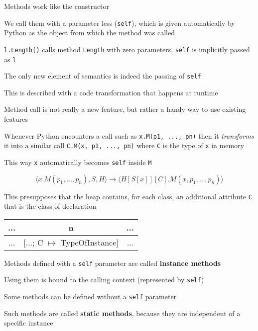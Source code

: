 \documentclass{beamer}
\begin{document}
\begin{slide}{
\item Methods work like the constructor
\item We call them with a parameter less (\texttt{self}), which is given automatically by Python as the object from which the method was called
\item \texttt{l.Length()} calls method \texttt{Length} with zero parameters, \texttt{self} is implicitly passed as \texttt{l}
}\end{slide}

\begin{slide}{
\item The only new element of semantics is indeed the passing of \texttt{self}
\item This is described with a code transformation that happens at runtime
\item Method call is not really a new feature, but rather a handy way to use existing features
}\end{slide}

\begin{slide}{
\item Whenever Python encounters a call such as \texttt{x.M(p1, ..., pn)} then it \textit{transforms} it into a similar call \texttt{C.M(x, p1, ..., pn)} where \texttt{C} is the type of \texttt{x} in memory
\item This way \texttt{x} automatically becomes \texttt{self} inside \texttt{M}

$$\langle x.M(p_1,\dots,p_n), S, H \rangle \rightarrow \langle H[S[x]][C].M(x,p_1,\dots,p_n) \rangle$$

\item This presupposes that the heap contains, for each class, an additional attribute \texttt{C} that is the class of declaration

\begin{tabular}{|c|c|c|}
\hline
... & n & ... \\
\hline
... & [...; C $\mapsto$ TypeOfInstance] & ... \\
\hline
\end{tabular}
}\end{slide}

\begin{slide}{
\item Methods defined with a \texttt{self} parameter are called \textbf{instance methods}
\item Using them is bound to the calling context (represented by \texttt{self})
\item Some methods can be defined without a \texttt{self} parameter
\item Such methods are called \textbf{static methods}, because they are independent of a specific instance
}\end{slide}
\end{document}
